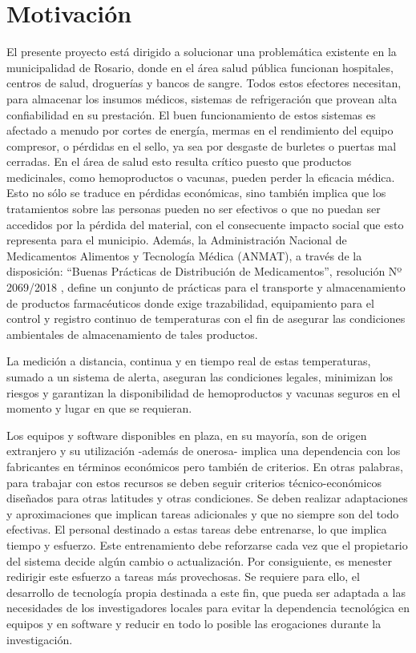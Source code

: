 \section{Motivación}
\label{}
El presente proyecto está dirigido a solucionar una problemática existente en la municipalidad de Rosario, donde en el área salud pública funcionan  hospitales, centros de salud, droguerías y bancos de sangre. Todos estos efectores necesitan, para almacenar los insumos médicos, sistemas de refrigeración que provean alta confiabilidad en su prestación.
El buen funcionamiento de estos sistemas es afectado a menudo por cortes de energía, mermas en el rendimiento del equipo compresor, o pérdidas en el sello, ya sea por desgaste de burletes o puertas mal cerradas.
En el área de salud esto resulta crítico puesto que productos medicinales, como hemoproductos o vacunas, pueden perder la eficacia médica. Esto no sólo se traduce en pérdidas económicas, sino también implica que los tratamientos sobre las personas pueden no ser efectivos o que no puedan ser accedidos por la pérdida del material, con el consecuente impacto social que esto representa para el municipio. 
Además, la Administración Nacional de Medicamentos Alimentos y Tecnología Médica (ANMAT), a través de la disposición: ``Buenas Prácticas de Distribución de Medicamentos'', resolución Nº 2069/2018 \citep{anmat}, define un conjunto de prácticas para el transporte y almacenamiento de productos farmacéuticos donde exige trazabilidad, equipamiento para el control y registro continuo de temperaturas con el fin de asegurar las condiciones ambientales de almacenamiento de tales productos. 

La medición a distancia, continua y en tiempo real de estas temperaturas, sumado a un sistema de alerta, aseguran las condiciones legales, minimizan los riesgos y garantizan la disponibilidad de hemoproductos y vacunas seguros en el momento y lugar en que se requieran.

Los equipos y software disponibles en plaza, en su mayoría, son de origen extranjero y su utilización -además de onerosa- implica una dependencia con los fabricantes en términos económicos pero también de criterios. En otras palabras, para trabajar con estos recursos se deben seguir criterios técnico-económicos diseñados para otras latitudes y otras condiciones. Se deben realizar adaptaciones y aproximaciones que implican tareas adicionales y que no siempre son del todo efectivas. El personal destinado a estas tareas debe entrenarse, lo que implica tiempo y esfuerzo. Este entrenamiento debe reforzarse cada vez que el propietario del sistema decide algún cambio o actualización. Por consiguiente, es menester redirigir este esfuerzo a tareas más provechosas.
Se requiere para ello, el desarrollo de tecnología propia destinada a este fin, que pueda ser adaptada a las necesidades de los investigadores locales para evitar la dependencia tecnológica en equipos y en software y reducir en todo lo posible las erogaciones durante la investigación.

